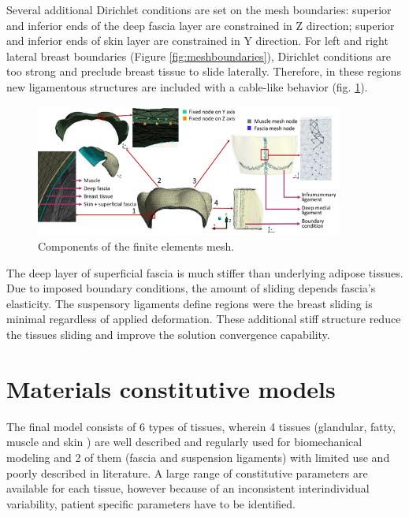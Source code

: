 Several additional Dirichlet conditions are set on the mesh boundaries: superior and inferior ends of the deep fascia layer are constrained in Z direction; superior and inferior ends of skin layer are constrained in Y direction. For left and right lateral breast boundaries (Figure \ref{fig:meshboundaries}), Dirichlet conditions are too strong and preclude breast tissue to slide laterally. Therefore, in these regions new ligamentous structures are included with a cable-like behavior (fig. \ref{fig:mesh_components_BC}).



\begin{figure}[!h]
\centering
\includegraphics[width=0.9\textwidth,keepaspectratio]{figures/mesh_components.png} 
\caption{Components of the finite elements mesh.}\label{fig:mesh_components_BC}
\end{figure}

 The deep layer of superficial fascia is much stiffer than underlying adipose tissues. Due to imposed boundary conditions, the amount of sliding depends fascia's elasticity. The suspensory ligaments define regions were the breast sliding is minimal regardless of applied deformation. These additional stiff structure reduce the tissues sliding and improve the solution convergence capability. 

\section{Materials constitutive models}
\label{section:myConstitutivModels}

The final model consists of 6 types of tissues, wherein 4 tissues (glandular, fatty, muscle and skin ) are well described and regularly used for biomechanical modeling and 2 of them (fascia and suspension ligaments) with limited use and poorly described in literature. A large range of constitutive parameters are available for each tissue, however because of an  inconsistent interindividual variability, patient specific parameters have to be identified.  


